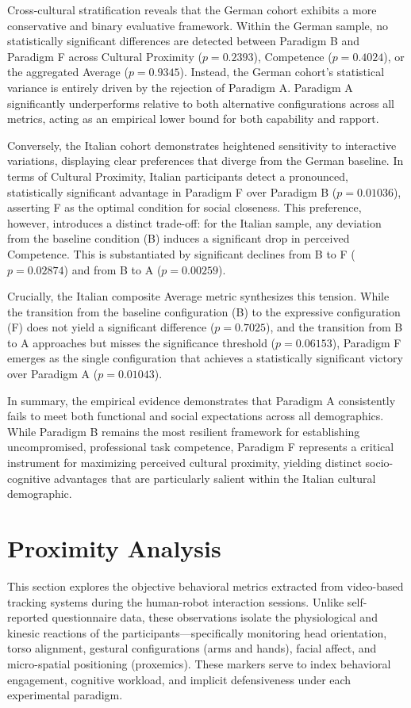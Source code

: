Cross-cultural stratification reveals that the German cohort exhibits a more conservative and binary evaluative framework.
Within the German sample, no statistically significant differences are detected between Paradigm B and Paradigm F across Cultural Proximity ($p = 0.2393$), Competence ($p = 0.4024$), or the aggregated Average ($p = 0.9345$). 
Instead, the German cohort's statistical variance is entirely driven by the rejection of Paradigm A. 
Paradigm A significantly underperforms relative to both alternative configurations across all metrics, acting as an empirical lower bound for both capability and rapport.

Conversely, the Italian cohort demonstrates heightened sensitivity to interactive variations, displaying clear preferences that diverge from the German baseline. 
In terms of Cultural Proximity, Italian participants detect a pronounced, statistically significant advantage in Paradigm F over Paradigm B ($p = 0.01036$), asserting F as the optimal condition for social closeness. 
This preference, however, introduces a distinct trade-off: for the Italian sample, any deviation from the baseline condition (B) induces a significant drop in perceived Competence. 
This is substantiated by significant declines from B to F ($p = 0.02874$) and from B to A ($p = 0.00259$). 

Crucially, the Italian composite Average metric synthesizes this tension. While the transition from the baseline configuration (B) to the expressive configuration (F) does not yield a significant difference ($p = 0.7025$), and the transition from B to A approaches but misses the significance threshold ($p = 0.06153$), Paradigm F emerges as the single configuration that achieves a statistically significant victory over Paradigm A ($p = 0.01043$).

In summary, the empirical evidence demonstrates that Paradigm A consistently fails to meet both functional and social expectations across all demographics. 
While Paradigm B remains the most resilient framework for establishing uncompromised, professional task competence, Paradigm F represents a critical instrument for maximizing perceived cultural proximity, yielding distinct socio-cognitive advantages that are particularly salient within the Italian cultural demographic.

\section{Proximity Analysis}
This section explores the objective behavioral metrics extracted from video-based tracking systems during the human-robot interaction sessions. 
Unlike self-reported questionnaire data, these observations isolate the physiological and kinesic reactions of the participants—specifically monitoring head orientation, torso alignment, gestural configurations (arms and hands), facial affect, and micro-spatial positioning (proxemics). 
These markers serve to index behavioral engagement, cognitive workload, and implicit defensiveness under each experimental paradigm.

